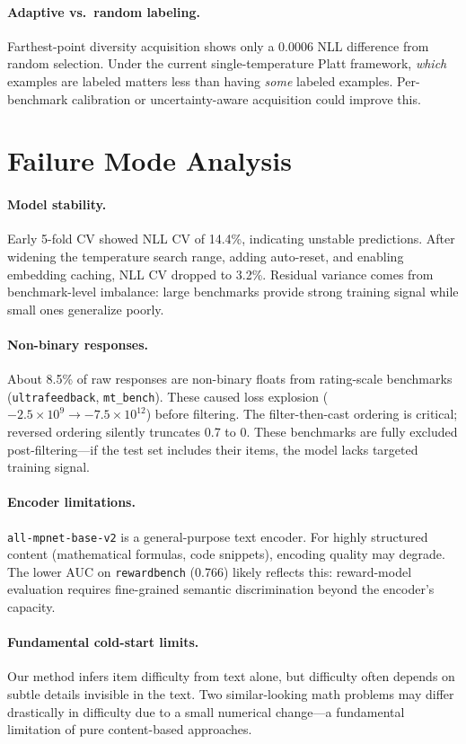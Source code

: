 \documentclass{article}
\begin{document}
\paragraph{Adaptive vs.\ random labeling.}
Farthest-point diversity acquisition shows only a 0.0006 NLL difference from random selection.
Under the current single-temperature Platt framework, \emph{which} examples are labeled matters less than having \emph{some} labeled examples.
Per-benchmark calibration or uncertainty-aware acquisition could improve this.

\section{Failure Mode Analysis}

\paragraph{Model stability.}
Early 5-fold CV showed NLL CV of 14.4\%, indicating unstable predictions.
After widening the temperature search range, adding auto-reset, and enabling embedding caching, NLL CV dropped to 3.2\%.
Residual variance comes from benchmark-level imbalance: large benchmarks provide strong training signal while small ones generalize poorly.

\paragraph{Non-binary responses.}
About 8.5\% of raw responses are non-binary floats from rating-scale benchmarks (\texttt{ultrafeedback}, \texttt{mt\_bench}).
These caused loss explosion ($-2.5 \times 10^9 \to -7.5 \times 10^{12}$) before filtering.
The filter-then-cast ordering is critical; reversed ordering silently truncates 0.7 to 0.
These benchmarks are fully excluded post-filtering---if the test set includes their items, the model lacks targeted training signal.

\paragraph{Encoder limitations.}
\texttt{all-mpnet-base-v2} is a general-purpose text encoder.
For highly structured content (mathematical formulas, code snippets), encoding quality may degrade.
The lower AUC on \texttt{rewardbench} (0.766) likely reflects this: reward-model evaluation requires fine-grained semantic discrimination beyond the encoder's capacity.

\paragraph{Fundamental cold-start limits.}
Our method infers item difficulty from text alone, but difficulty often depends on subtle details invisible in the text.
Two similar-looking math problems may differ drastically in difficulty due to a small numerical change---a fundamental limitation of pure content-based approaches.
\end{document}
